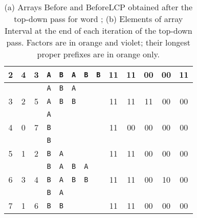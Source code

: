 \documentclass{llncs}
\newcommand{\Before}{\textsf{Before}}
\newcommand{\BeforeLCP}{\textsf{BeforeLCP}}
\newcommand{\Interval}{\textsf{Interval}}
\begin{document}
\begin{table}[!t]
\begin{center}
{{\begin{tabular}{|*{3}{c|}*{4}{c}*{6}{c|}}
2&4&3&\cellcolor{Apricot}\texttt{A}&\cellcolor{Apricot}\texttt{B}&\cellcolor{Apricot}\texttt{A}&\cellcolor{Apricot}\texttt{B}&\cellcolor{Thistle}\texttt{B}&11&11&00&00&11\\ \hline
 & & &\cellcolor{Apricot}\texttt{A}&\cellcolor{Apricot}\texttt{B}&\cellcolor{Thistle}\texttt{A}& & & & & & & \\ \hline
3&2&5&\cellcolor{Apricot}\texttt{A}&\cellcolor{Apricot}\texttt{B}&\cellcolor{Thistle}\texttt{B}& & &11&11&11&00&00\\ \hline
 & & &\cellcolor{Thistle}\texttt{A}& & & & & & & & & \\ \hline
4&0&7&\cellcolor{Thistle}\texttt{B}& & & & &11&00&00&00&00\\ \hline
 & & &\cellcolor{Apricot}\texttt{B}&\cellcolor{Thistle}& & & & & & & &\\ \hline
5&1&2&\cellcolor{Apricot}\texttt{B}&\cellcolor{Thistle}\texttt{A}& & & &11&11&00&00&00\\ \hline
 & & &\cellcolor{Apricot}\texttt{B}&\cellcolor{Apricot}\texttt{A}&\cellcolor{Apricot}\texttt{B}&\cellcolor{Thistle}\texttt{A}& & & & & &\\ \hline
6&3&4&\cellcolor{Apricot}\texttt{B}&\cellcolor{Apricot}\texttt{A}&\cellcolor{Apricot}\texttt{B}&\cellcolor{Thistle}\texttt{B}& &11&11&00&10&00\\ \hline
 & & &\cellcolor{Apricot}\texttt{B}&\cellcolor{Thistle}\texttt{A}& & & & & & & &\\ \hline
7&1&6&\cellcolor{Apricot}\texttt{B}&\cellcolor{Thistle}\texttt{B}& & & &11&11&00&00&00\\ \hline
\end{tabular}
}
}
\end{center}
  \caption{(a) Arrays \Before{} and \BeforeLCP{} obtained after the top-down pass for word ; (b) Elements of array \Interval{}
at the end of each iteration of the top-down pass. Factors  are in orange and violet; their longest proper prefixes are in orange only.}
\label{tab:td}
\end{table}
\end{document}
